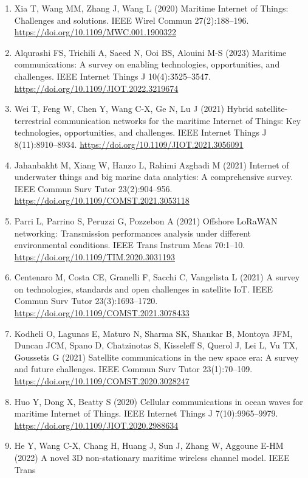 \documentclass[
  11pt,
]{article}
\providecommand{\tightlist}{%
  \setlength{\itemsep}{0pt}\setlength{\parskip}{0pt}}
\begin{document}
\begin{enumerate}
\def\labelenumi{\arabic{enumi}.}
\tightlist
\item
  Xia T, Wang MM, Zhang J, Wang L (2020) Maritime Internet of Things:
  Challenges and solutions. IEEE Wirel Commun 27(2):188--196.
  \url{https://doi.org/10.1109/MWC.001.1900322}
\item
  Alqurashi FS, Trichili A, Saeed N, Ooi BS, Alouini M-S (2023) Maritime
  communications: A survey on enabling technologies, opportunities, and
  challenges. IEEE Internet Things J 10(4):3525--3547.
  \url{https://doi.org/10.1109/JIOT.2022.3219674}
\item
  Wei T, Feng W, Chen Y, Wang C-X, Ge N, Lu J (2021) Hybrid
  satellite-terrestrial communication networks for the maritime Internet
  of Things: Key technologies, opportunities, and challenges. IEEE
  Internet Things J 8(11):8910--8934.
  \url{https://doi.org/10.1109/JIOT.2021.3056091}
\item
  Jahanbakht M, Xiang W, Hanzo L, Rahimi Azghadi M (2021) Internet of
  underwater things and big marine data analytics: A comprehensive
  survey. IEEE Commun Surv Tutor 23(2):904--956.
  \url{https://doi.org/10.1109/COMST.2021.3053118}
\item
  Parri L, Parrino S, Peruzzi G, Pozzebon A (2021) Offshore LoRaWAN
  networking: Transmission performances analysis under different
  environmental conditions. IEEE Trans Instrum Meas 70:1--10.
  \url{https://doi.org/10.1109/TIM.2020.3031193}
\item
  Centenaro M, Costa CE, Granelli F, Sacchi C, Vangelista L (2021) A
  survey on technologies, standards and open challenges in satellite
  IoT. IEEE Commun Surv Tutor 23(3):1693--1720.
  \url{https://doi.org/10.1109/COMST.2021.3078433}
\item
  Kodheli O, Lagunas E, Maturo N, Sharma SK, Shankar B, Montoya JFM,
  Duncan JCM, Spano D, Chatzinotas S, Kisseleff S, Querol J, Lei L, Vu
  TX, Goussetis G (2021) Satellite communications in the new space era:
  A survey and future challenges. IEEE Commun Surv Tutor 23(1):70--109.
  \url{https://doi.org/10.1109/COMST.2020.3028247}
\item
  Huo Y, Dong X, Beatty S (2020) Cellular communications in ocean waves
  for maritime Internet of Things. IEEE Internet Things J
  7(10):9965--9979. \url{https://doi.org/10.1109/JIOT.2020.2988634}
\item
  He Y, Wang C-X, Chang H, Huang J, Sun J, Zhang W, Aggoune E-HM (2022)
  A novel 3D non-stationary maritime wireless channel model. IEEE Trans

\end{enumerate}
\end{document}
